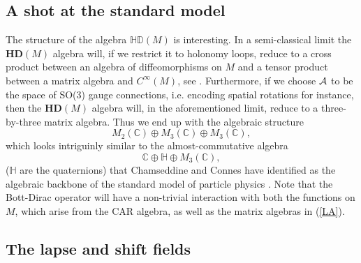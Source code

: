 \documentclass[letterpaper,11pt]{article}
\def\ca{{\cal A}}
\begin{document}
\subsection{A shot at the standard model}


The structure of the algebra $ \mathds{HD}(M)$ is interesting. In a semi-classical limit the $\mathbf{HD}(M)$ algebra will, if we restrict it to holonomy loops, reduce to a cross product between an algebra of diffeomorphisms on $M$ and a tensor product between a matrix algebra and $C^\infty(M)$, see \cite{Aastrup:2015gba}. Furthermore, if we choose $\ca$ to be the space of SO(3) gauge connections, i.e. encoding spatial rotations for instance, then the $\mathbf{HD}(M)$ algebra will, in the aforementioned limit, reduce to a three-by-three matrix algebra.
Thus we end up with the algebraic structure
\begin{equation}M_2(\mathbb{C})\oplus M_3(\mathbb{C}) \oplus M_3(\mathbb{C})  ,
\label{LA}
\end{equation}
which looks intriguinly similar to the almost-commutative algebra $$ \mathbb{C} \oplus {\mathbb H}\oplus M_3(\mathbb{C})  ,$$ (${\mathbb H}$ are the quaternions) that Chamseddine and Connes have identified as the algebraic backbone of the standard model of particle physics \cite{Connes:1996gi}. Note that the Bott-Dirac operator will have a non-trivial interaction with both the functions on $M$, which arise from the CAR algebra, as well as the matrix algebras in (\ref{LA}).






\subsection{The lapse and shift fields}
\label{secadd}
\end{document}
